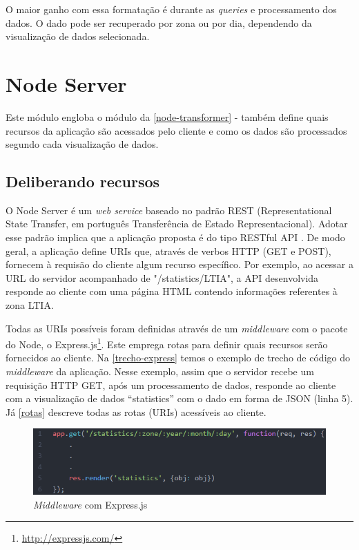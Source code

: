 O maior ganho com essa formatação é durante as \emph{queries} e processamento dos dados. O dado pode ser recuperado
por zona ou por dia, dependendo da visualização de dados selecionada.

\section{Node Server}
\label{node-server}
Este módulo engloba o módulo da \autoref{node-transformer} - também define
quais recursos da aplicação são acessados pelo cliente e como os dados
são processados segundo cada visualização de dados.

\subsection{Deliberando recursos}
O Node Server é um \emph{web service} baseado no padrão REST (Representational
State Transfer, em português Transferência de Estado Representacional). Adotar esse padrão implica que a aplicação proposta é do tipo RESTful API \cite{pires2017}. De
modo geral, a aplicação define URIs que, através de verbos HTTP (GET e POST),
fornecem à requisão do cliente algum recurso específico. Por exemplo, ao acessar
a URL do servidor acompanhado de "/statistics/LTIA", a API desenvolvida responde
ao cliente com uma página HTML contendo informações referentes à zona LTIA.

Todas as URIs possíveis foram definidas através de um \emph{middleware} com o
pacote do Node, o Express.js\footnote{\url{http://expressjs.com/}}. Este emprega
rotas para definir quais recursos serão fornecidos ao cliente. Na
\autoref{trecho-express} temos o exemplo de trecho de código do
\emph{middleware} da aplicação. Nesse exemplo, assim que o servidor recebe um
requisição HTTP GET, após um processamento de dados, responde ao cliente com a
visualização de dados ``statistics'' com o dado em forma de JSON (linha 5). Já
\autoref{rotas} descreve todas as rotas (URIs) acessíveis ao cliente.

\begin{figure}[!h]
  \caption{\label{trecho-express}\emph{Middleware} com Express.js}
  \begin{center}
    \includegraphics[width=1.0\textwidth]{img/trecho-express.png}
  \end{center}
\end{figure}

